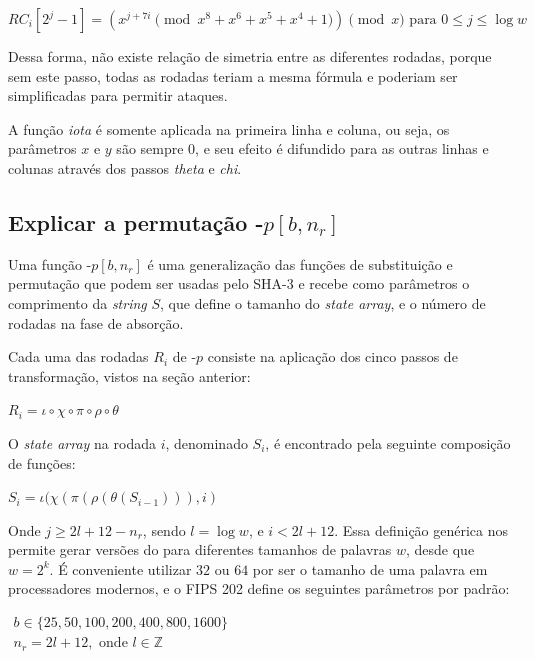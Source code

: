 $RC_{i}[2^{j}-1] = (x^{j+7i} \pmod{x^8 + x^6 + x^5 + x^4 + 1}) \pmod{x} \mbox{ para } 0 \leq j \leq \log w$

Dessa forma, não existe relação de simetria entre as diferentes rodadas, porque
sem este passo, todas as rodadas teriam a mesma fórmula e poderiam ser
simplificadas para permitir ataques.

A função \textit{iota} é somente aplicada na primeira linha e coluna, ou seja,
os parâmetros $x$ e $y$ são sempre 0, e seu efeito é difundido para as outras
linhas e colunas através dos passos \textit{theta} e \textit{chi}.

\subsection{Explicar a permutação \Keccak-$p[b,n_r]$}

Uma função \Keccak-$p[b, n_r]$ é uma generalização das funções de substituição
e permutação \Keccak que podem ser usadas pelo SHA-3 e recebe como parâmetros o
comprimento da \textit{string} $S$, que define o tamanho do
\textit{state array}, e o número de rodadas na fase de absorção.

Cada uma das rodadas $R_{i}$ de \Keccak-$p$ consiste na aplicação dos cinco
passos de transformação, vistos na seção anterior:

\begin{center}
    $R_{i} = \iota \circ \chi \circ \pi \circ \rho \circ \theta$
\end{center}

O \textit{state array} na rodada $i$, denominado $S_{i}$, é encontrado pela
seguinte composição de funções:

\begin{center}
    $S_{i} = \iota(\chi(\pi(\rho(\theta(S_{i-1}))), i)$
\end{center}

Onde $j \geq 2l + 12 - n_r$, sendo $l = \log w$, e $i < 2l + 12$. Essa
definição genérica nos permite gerar versões do \Keccak para diferentes
tamanhos de palavras $w$, desde que $w = 2^{k}$. É conveniente utilizar $32$ ou
$64$ por ser o tamanho de uma palavra em processadores modernos, e o FIPS 202
define os seguintes parâmetros por padrão:

$\begin{array}{l}
    b \in \{25, 50, 100, 200, 400, 800, 1600\} \\
    n_{r} = 2l + 12, \mbox{ onde } l \in \mathbb{Z}
\end{array}$

